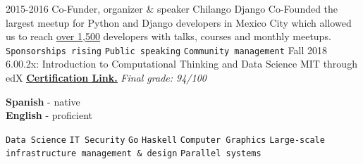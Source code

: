 \documentclass[9pt]{developercv}
\begin{document}
\begin{entrylist}
    \entry
        {2015-2016}
        {Co-Funder, organizer \& speaker}
        {Chilango Django}
        {
            Co-Founded the largest meetup for Python and Django developers in Mexico
            City which allowed us to reach
            {\href{https://meetup.com/Chilango-Django/}{\underline{over 1,500}}}
            developers with talks, courses and monthly meetups.\\
                \texttt{Sponsorships rising}\slashsep
                \texttt{Public speaking}\slashsep
                \texttt{Community management}
        }
    \entry
        {Fall 2018}
        {6.00.2x: Introduction to Computational Thinking and Data Science}
        {MIT through edX}
        {{\href{https://courses.edx.org/certificates/44a472b535354c15b494ac70b98af436}{\textbf{\underline{Certification Link.}}}} \textit{\small{Final grade: 94/100}}} \\
        
\end{entrylist}


\begin{minipage}[t]{0.3\textwidth}
    \vspace{-\baselineskip}

    
    \textbf{Spanish} - native\\
    \textbf{English} - proficient
\end{minipage}
\hfill
\begin{minipage}[t]{0.8\textwidth}
    \vspace{-\baselineskip}


    \texttt{Data Science}\slashsep
    \texttt{IT Security}\slashsep
    \texttt{Go}\slashsep
    \texttt{Haskell}\slashsep
    \texttt{Computer Graphics}\slashsep
    \texttt{Large-scale infrastructure management \& design}\slashsep
    \texttt{Parallel systems}
\end{minipage}

\end{document}
